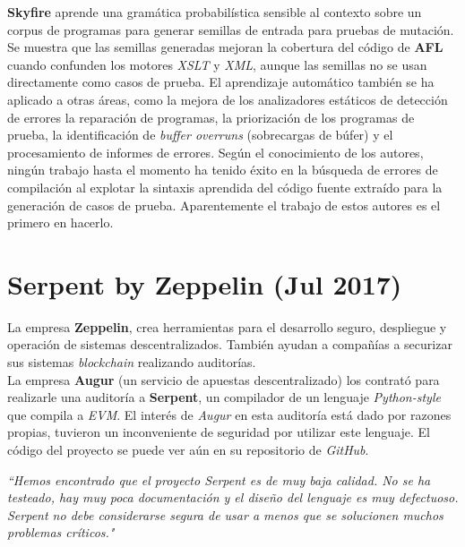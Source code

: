 \textbf{Skyfire}\cite{Wang:Chen:Wei:Liu:Skyfire} aprende una gramática probabilística sensible al contexto sobre un corpus de programas para generar semillas de entrada para pruebas de mutación. Se muestra que las semillas generadas mejoran la cobertura del código de \textbf{AFL}\cite{AFL} cuando confunden los motores \textit{XSLT} y \textit{XML}, aunque las semillas no se usan directamente como casos de prueba. El aprendizaje automático también se ha aplicado a otras áreas, como la mejora de los analizadores estáticos de detección de errores \cite{Heo:Oh:Yi:Unsound}\cite{Koc:Saadatpanah:Jeffrey:Porter:False} la reparación de programas\cite{Koukoutos:Raghothaman:Kneuss:Kuncak}\cite{White:Tufano:Martinez:Monperrus}, la priorización de los programas de prueba\cite{Chen:Bai:Hao:Xiong:Zhang}, la identificación de \textit{buffer overruns} (sobrecargas de búfer)\cite{Choi:Jeong:Oh:Choo:BufferOverruns} y el procesamiento de informes de errores\cite{Xuan:Ming:Buggy}\cite{Lam:Anh:Nguyen:Nguyen:DeepLearning}. Según el conocimiento de los autores, ningún trabajo hasta el momento ha tenido éxito en la búsqueda de errores de compilación al explotar la sintaxis aprendida del código fuente extraído para la generación de casos de prueba. Aparentemente el trabajo de estos autores es el primero en hacerlo.

\section{Serpent by Zeppelin (Jul 2017)}

La empresa \textbf{Zeppelin}, crea herramientas para el desarrollo seguro, despliegue y operación de sistemas descentralizados. También ayudan a compañías a securizar sus sistemas \textit{blockchain} realizando auditorías.\\

La empresa \textbf{Augur} (un servicio de apuestas descentralizado) los contrató para realizarle una auditoría a \textbf{Serpent}, un compilador de un lenguaje \textit{Python-style} que compila a \textit{EVM}. El interés de \textit{Augur} en esta auditoría está dado por razones propias, tuvieron un inconveniente de seguridad por utilizar este lenguaje. El código del proyecto se puede ver aún en su repositorio de \textit{GitHub}\cite{SerpentRepository}.\\

\begin{displayquote}
    \textit{``Hemos encontrado que el proyecto Serpent es de muy baja calidad. No se ha testeado, hay muy poca documentación y el diseño del lenguaje es muy defectuoso. Serpent no debe considerarse segura de usar a menos que se solucionen muchos problemas críticos."}
\end{displayquote}

